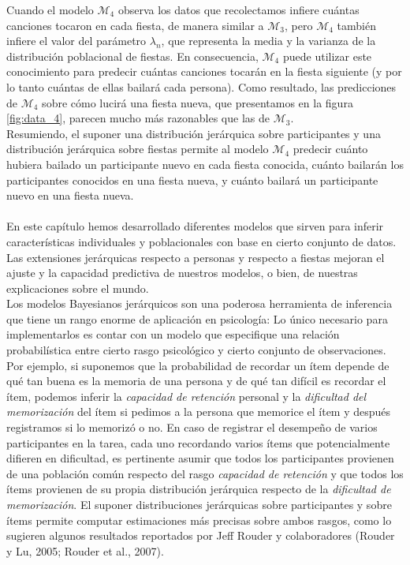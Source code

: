 \documentclass{article}
\begin{document}
\indent	Cuando el modelo $\mathcal M_4$ observa los datos que recolectamos infiere cuántas canciones tocaron en cada fiesta, de manera similar a $\mathcal M_3$, pero $\mathcal M_4$ también infiere el valor del parámetro $\lambda_n$, que representa la media y la varianza de la distribución poblacional de fiestas. En consecuencia, $\mathcal M_4$ puede utilizar este conocimiento para predecir cuántas canciones tocarán en la fiesta siguiente (y por lo tanto cuántas de ellas bailará cada persona). Como resultado, las predicciones de $\mathcal M_4$ sobre cómo lucirá una fiesta nueva, que presentamos en la figura \ref{fig:data_4}, parecen mucho más razonables que las de $\mathcal M_3$.\\
\indent Resumiendo, el suponer una distribución jerárquica sobre participantes y una distribución jerárquica sobre fiestas permite al modelo $\mathcal M_4$ predecir cuánto hubiera bailado un participante nuevo en cada fiesta conocida, cuánto bailarán los participantes conocidos en una fiesta nueva, y cuánto bailará un participante nuevo en una fiesta nueva. \\\\
\indent En este capítulo hemos desarrollado diferentes modelos que sirven para inferir características individuales y poblacionales con base en cierto conjunto de datos. Las extensiones jerárquicas respecto a personas y respecto a fiestas mejoran el ajuste y la capacidad predictiva de nuestros modelos, o bien, de nuestras explicaciones sobre el mundo.\\
\indent Los modelos Bayesianos jerárquicos son una poderosa herramienta de inferencia que tiene un rango enorme de aplicación en psicología: Lo único necesario para implementarlos es contar con un modelo que especifique una relación probabilística entre cierto rasgo psicológico y cierto conjunto de observaciones. Por ejemplo, si suponemos que la probabilidad de recordar un ítem depende de qué tan buena es la memoria de una persona y de qué tan difícil es recordar el ítem, podemos inferir la \emph{capacidad de retención} personal y la \emph{dificultad del memorización} del ítem si pedimos a la persona que memorice el ítem y después registramos si lo memorizó o no. En caso de registrar el desempeño de varios participantes en la tarea, cada uno recordando varios ítems que potencialmente difieren en dificultad, es pertinente asumir que todos los participantes provienen de una población común respecto del rasgo \emph{capacidad de retención} y que todos los ítems provienen de su propia distribución jerárquica respecto de la \emph{dificultad de memorización}. El suponer distribuciones jerárquicas sobre participantes y sobre ítems permite computar estimaciones más precisas sobre ambos rasgos, como lo sugieren algunos resultados reportados por Jeff Rouder y colaboradores (Rouder y Lu, 2005; Rouder et al., 2007). 
\end{document}
